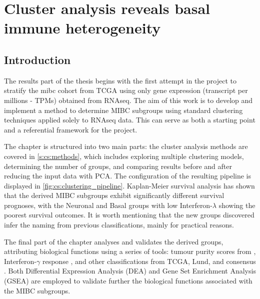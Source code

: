 \chapter{Cluster analysis reveals basal immune heterogeneity} \label{s:clustering_analysis}

\vspace{3mm}
\vspace{3mm}

\section{Introduction}

The results part of the thesis begins with the first attempt in the project to stratify the \acrfull{mibc} cohort from TCGA using only gene expression (transcript per millions - TPMs) obtained from RNAseq. The aim of this work is to develop and implement a method to determine MIBC subgroups using standard clustering techniques applied solely to RNAseq data. This can serve as both a starting point and a referential framework for the project.

The chapter is structured into two main parts: the cluster analysis methods are covered in \cref{s:cs:methods}, which includes exploring multiple clustering models, determining the number of groups, and comparing results before and after reducing the input data with PCA. The configuration of the resulting pipeline is displayed in \cref{fig:cs:clustering_pipeline}. Kaplan-Meier survival analysis has shown that the derived MIBC subgroups exhibit significantly different survival prognoses, with the Neuronal and Basal groups with low Interferon-$\lambda$ showing the poorest survival outcomes. It is worth mentioning that the new groups discovered infer the naming from previous classifications, mainly for practical reasons.

The final part of the chapter analyses and validates the derived groups, attributing biological functions using a series of tools: tumour purity scores from \citet{Yoshihara2013-wq}, Interferon-$\gamma$ response \citet{Baker2022-bj}, and other classifications from TCGA, Lund, and consensus \citep{Robertson2017-mg,Marzouka2018-ge,Kamoun2020-tj}. Both Differential Expression Analysis (DEA) and Gene Set Enrichment Analysis (GSEA) are employed to validate further the biological functions associated with the MIBC subgroups.



